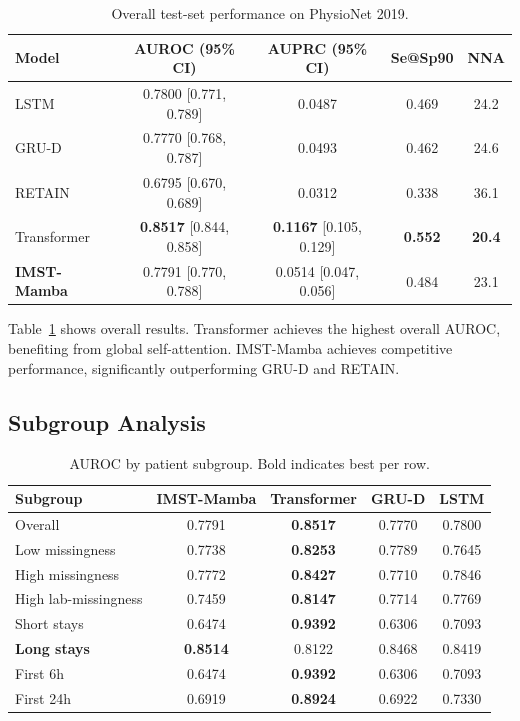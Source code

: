 \documentclass[twoside,11pt]{article}
\begin{document}
\begin{table}[t]
\caption{Overall test-set performance on PhysioNet 2019.}
\label{tab:overall}
\centering
\begin{tabular}{lcccc}
\toprule
Model & AUROC (95\% CI) & AUPRC (95\% CI) & Se@Sp90 & NNA \\
\midrule
LSTM        & 0.7800 \small{[0.771, 0.789]} & 0.0487 & 0.469 & 24.2 \\
GRU-D       & 0.7770 \small{[0.768, 0.787]} & 0.0493 & 0.462 & 24.6 \\
RETAIN      & 0.6795 \small{[0.670, 0.689]} & 0.0312 & 0.338 & 36.1 \\
Transformer & \textbf{0.8517} \small{[0.844, 0.858]}
            & \textbf{0.1167} \small{[0.105, 0.129]}
            & \textbf{0.552} & \textbf{20.4} \\
\midrule
\textbf{IMST-Mamba}
            & 0.7791 \small{[0.770, 0.788]}
            & 0.0514 \small{[0.047, 0.056]}
            & 0.484 & 23.1 \\
\bottomrule
\end{tabular}
\end{table}

Table~\ref{tab:overall} shows overall results.  Transformer achieves the
highest overall AUROC, benefiting from global self-attention.  IMST-Mamba
achieves competitive performance, significantly outperforming GRU-D and RETAIN.

\subsection{Subgroup Analysis}

\begin{table}[t]
\caption{AUROC by patient subgroup.  Bold indicates best per row.}
\label{tab:subgroup}
\centering
\begin{tabular}{lcccc}
\toprule
Subgroup & IMST-Mamba & Transformer & GRU-D & LSTM \\
\midrule
Overall              & 0.7791 & \textbf{0.8517} & 0.7770 & 0.7800 \\
Low missingness      & 0.7738 & \textbf{0.8253} & 0.7789 & 0.7645 \\
High missingness     & 0.7772 & \textbf{0.8427} & 0.7710 & 0.7846 \\
High lab-missingness & 0.7459 & \textbf{0.8147} & 0.7714 & 0.7769 \\
Short stays          & 0.6474 & \textbf{0.9392} & 0.6306 & 0.7093 \\
\textbf{Long stays}  & \textbf{0.8514} & 0.8122 & 0.8468 & 0.8419 \\
First 6h             & 0.6474 & \textbf{0.9392} & 0.6306 & 0.7093 \\
First 24h            & 0.6919 & \textbf{0.8924} & 0.6922 & 0.7330 \\
\bottomrule
\end{tabular}
\end{table}
\end{document}
